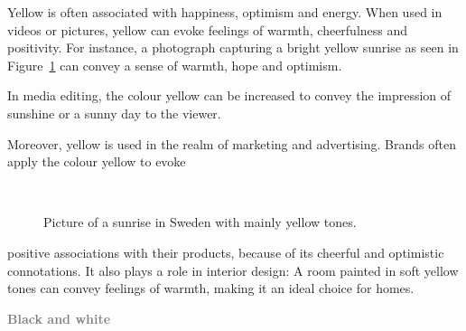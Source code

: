 \documentclass[../MasterThesis.tex]{subfiles}
\begin{document}
%
\begin{minipage}{0.45\textwidth}
	Yellow is often associated with happiness, optimism and energy. When used in videos or pictures, yellow can evoke feelings of warmth, cheerfulness and positivity. For instance, a photograph capturing a bright yellow sunrise as seen in Figure~\ref{figure:yellow} can convey a sense of warmth, hope and optimism.
	
	In media editing, the colour yellow can be increased to convey the impression of sunshine or a sunny day to the viewer.
	
	Moreover, yellow is used in the realm of marketing and advertising. Brands often apply the colour yellow to evoke 
	
	
\end{minipage}\begin{minipage}{0.05\textwidth}
	\ 
\end{minipage}\begin{minipage}{0.5\textwidth}
	\begin{figure}[H]
		\begin{center}
			\caption[Picture of a sunrise in Sweden with mainly yellow tones.]{Picture of a sunrise in Sweden with mainly yellow tones.}
			\label{figure:yellow}
		\end{center}
	\end{figure}\hfill
\end{minipage}

positive associations with their products, because of its cheerful and optimistic connotations. It also plays a role in interior design: A room painted in soft yellow tones can convey feelings of warmth, making it an ideal choice for homes.~\cite{colour2}





\textbf{\textcolor{gray}{Black and white}}
\end{document}
